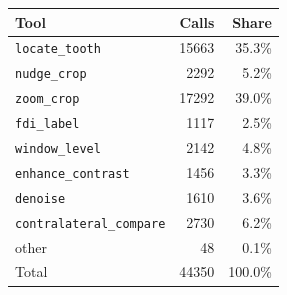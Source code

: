 \begin{tabular}{lrr}
\toprule
Tool & Calls & Share \\
\midrule
\texttt{locate_tooth} & 15663 & 35.3\% \\
\texttt{nudge_crop} & 2292 & 5.2\% \\
\texttt{zoom_crop} & 17292 & 39.0\% \\
\texttt{fdi_label} & 1117 & 2.5\% \\
\texttt{window_level} & 2142 & 4.8\% \\
\texttt{enhance_contrast} & 1456 & 3.3\% \\
\texttt{denoise} & 1610 & 3.6\% \\
\texttt{contralateral_compare} & 2730 & 6.2\% \\
other & 48 & 0.1\% \\
\midrule
Total & 44350 & 100.0\% \\
\bottomrule
\end{tabular}